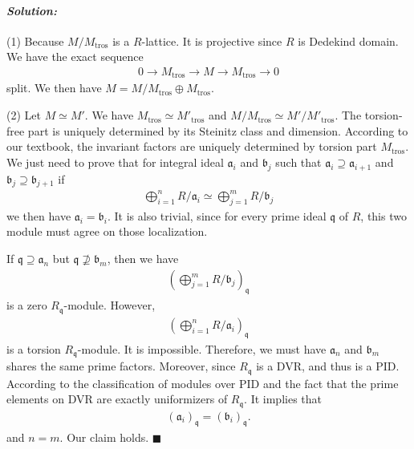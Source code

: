 \documentclass[12pt, a4paper]{article}
\newenvironment{solution}
  {\paragraph{\textit{Solution:}}\par\medskip}
  {\hfill$\blacksquare$\vspace{0.1cm}}
\begin{document}
\begin{solution}
    (1) Because $M/M_{\text{tros}}$ is a $R$-lattice. It is projective since $R$ is Dedekind domain.
    We have the exact sequence 
    \begin{align*}
        0\to M_{\text{tros}} \to M \to M_{\text{tros}}\to 0
    \end{align*} 
    split. We then have $M = M/M_{\text{tros}}\oplus M_{\text{tros}}$.

    (2) Let $M\simeq M'$. We have $M_{\text{tros}}\simeq M'_{\text{tros}}$ and $M/M_{\text{tros}}\simeq  M'/M'_{\text{tros}}$.
    The torsion-free part is uniquely determined by its Steinitz class and dimension.
    According to our textbook, the invariant factors are uniquely determined by torsion part $M_{\text{tros}}$.
    We just need to prove that for integral ideal $\mathfrak{a}_i$ and $\mathfrak{b}_j$ such that $\mathfrak{a}_i\supseteq \mathfrak{a}_{i+1}$ and $\mathfrak{b}_j\supseteq \mathfrak{b}_{j+1}$ 
    if 
    \begin{align*}
        \bigoplus_{i=1}^n R/\mathfrak{a}_i \simeq \bigoplus_{j=1}^m R/\mathfrak{b}_j
    \end{align*}
    we then have $\mathfrak{a}_i = \mathfrak{b}_i$.
    It is also trivial, since for every prime ideal $\mathfrak{q}$ of $R$, this two module must agree on those localization.

    If $\mathfrak{q}\supseteq \mathfrak{a}_n$ but $\mathfrak{q}\not\supseteq \mathfrak{b}_m$, then we have 
    \begin{align*}
        \left(\bigoplus_{j=1}^m R/\mathfrak{b}_j\right)_\mathfrak{q}
    \end{align*}
    is a zero $R_\mathfrak{q}$-module.
    However, 
    \begin{align*}
       \left(\bigoplus_{i=1}^n R/\mathfrak{a}_i\right)_\mathfrak{q}
    \end{align*}
    is a torsion $R_\mathfrak{q}$-module. It is impossible.
    Therefore, we must have $\mathfrak{a}_n$ and $\mathfrak{b}_m$ shares the same prime factors.
    Moreover, since $R_\mathfrak{q}$ is a DVR, and thus is a PID. According to the classification of modules over PID and 
    the fact that the prime elements on DVR are exactly uniformizers of $R_\mathfrak{q}$. It implies that 
    \begin{align*}
        (\mathfrak{a}_i)_\mathfrak{q}  = (\mathfrak{b}_i)_\mathfrak{q}.
    \end{align*}  
    and $n=m$.
    Our claim holds.
\end{solution}
\end{document}
